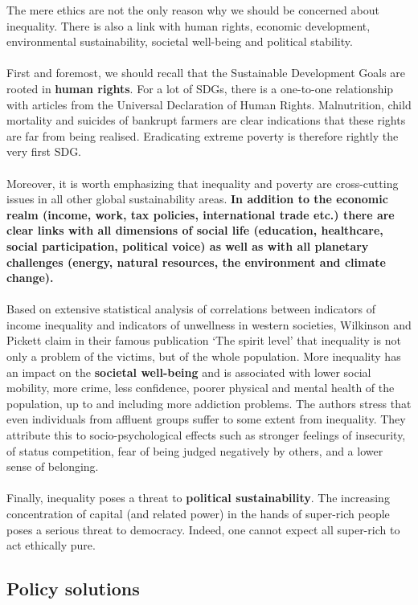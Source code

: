 \documentclass[../summary.tex]{subfiles}
\begin{document}
	The mere ethics are not the only reason why we should be concerned about inequality. There is also a link with human rights, economic development, environmental sustainability, societal well-being and political stability.
	\\\\
	First and foremost, we should recall that the Sustainable Development Goals are rooted in \textbf{human rights}. For a lot of SDGs, there is a one-to-one relationship with articles from the Universal Declaration of Human Rights. Malnutrition, child mortality and suicides of bankrupt farmers are clear indications that these rights are far from being realised. Eradicating extreme poverty is therefore rightly the very first SDG.
	\\\\
	Moreover, it is worth emphasizing that inequality and poverty are cross-cutting issues in all other global sustainability areas. \textbf{In addition to the economic realm (income, work, tax policies, international trade etc.) there are clear links with all dimensions of social life (education, healthcare, social participation, political voice) as well as with all planetary challenges (energy, natural resources, the environment and climate change).}
	\\\\
	Based on extensive statistical analysis of correlations between indicators of income inequality and indicators of unwellness in western societies, Wilkinson and Pickett claim in their famous publication ‘The spirit level’ that inequality is not only a problem of the victims, but of the whole population. More inequality has an impact on the \textbf{societal well-being} and is associated with lower social mobility, more crime, less confidence, poorer physical and mental health of the population, up to and including more addiction problems. The authors stress that even individuals from affluent groups suffer to some extent from inequality. They attribute this to socio-psychological effects such as stronger feelings of insecurity, of status competition, fear of being judged negatively by others, and a lower sense of belonging.
	\\\\
	Finally, inequality poses a threat to \textbf{political sustainability}. The increasing concentration of capital (and related power) in the hands of super-rich people poses a serious threat to democracy. Indeed, one cannot expect all super-rich to act ethically pure.
	
	\subsection{Policy solutions}
	
\end{document}

